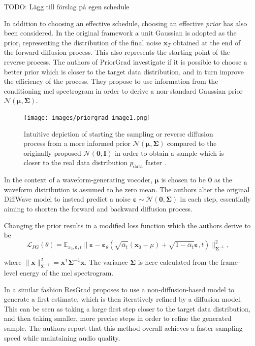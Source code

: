 \documentclass{article}
\begin{document}
TODO: Lägg till förslag på egen schedule

In addition to choosing an effective schedule, choosing an effective \textit{prior} has also been considered. In the original framework a unit Gaussian is adopted as the prior, representing the distribution of the final noise $\textbf{x}_T$ obtained at the end of the forward diffusion process. This also represents the starting point of the reverse process. The authors of PriorGrad \cite{lee2021priorgrad} investigate if it is possible to choose a better prior which is closer to the target data distribution, and in turn improve the efficiency of the process. They propose to use information from the conditioning mel spectrogram in order to derive a non-standard Gaussian prior $\mathcal{N}(\bm{\mu}, \bm{\Sigma})$.

\begin{figure}[H]
    \centering
    \texttt{[image: images/priorgrad\_image1.png]}
    \caption{\onehalfspacing Intuitive depiction of starting the sampling or reverse diffusion process from a more informed prior $\mathcal{N}(\bm{\mu}, \bm{\Sigma})$ compared to the originally proposed $\mathcal{N}(\bm{0}, \bm{I})$ in order to obtain a sample which is closer to the real data distribution $p_{\text{data}}$ faster \cite{lee2021priorgrad}.}
    \label{fig:priorgrad1}
\end{figure}

In the context of a waveform-generating vocoder, $\bm{\mu}$ is chosen to be $\bm{0}$ as the waveform distribution is assumed to be zero mean. The authors alter the original DiffWave model to instead predict a noise $\bm{\varepsilon} \sim \mathcal{N}(\bm{0}, \bm{\Sigma})$ in each step, essentially aiming to shorten the forward and backward diffusion process.

Changing the prior results in a modified loss function which the authors derive to be
\begin{equation}
    \mathcal{L}_{PG}(\theta) = \mathbb{E}_{x_0, \bm{\varepsilon}, t} \|\bm{\varepsilon} - \bm{\varepsilon}_{\theta}(\sqrt{\bar{\alpha}_t} (\textbf{x}_0-\mu) + \sqrt{1 - \bar{\alpha}_t} \bm{\varepsilon}, t) \|^2_{\bm{\Sigma}^{-1}},
\end{equation}

where $\|\bm{x} \|^2_{\bm{\Sigma}^{-1}} = \bm{x}^T \bm{\Sigma}^{-1} \bm{x}$. The variance $\bm{\Sigma}$ is here calculated from the frame-level energy of the mel spectrogram.

In a similar fashion ResGrad \cite{chen2022resgrad} proposes to use a non-diffusion-based model to generate a first estimate, which is then iteratively refined by a diffusion model. This can be seen as taking a large first step closer to the target data distribution, and then taking smaller, more precise steps in order to refine the generated sample. The authors report that this method overall achieves a faster sampling speed while maintaining audio quality.
\end{document}
